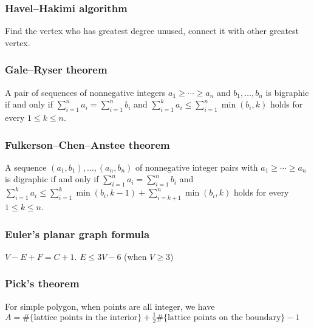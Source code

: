 \subsubsection{Havel–Hakimi algorithm}
Find the vertex who has greatest degree unused, connect it with other greatest vertex.

\subsubsection{Gale–Ryser theorem}
A pair of sequences of nonnegative integers $a_1\ge\cdots\ge a_n$ and $b_1,\ldots,b_n$ is bigraphic if and only if $\sum_{i=1}^n a_i=\sum_{i=1}^n b_i$ and $\sum_{i=1}^k a_i\le \sum_{i=1}^n\min(b_i,k)$ holds for every $1\le k\le n$.

\subsubsection{Fulkerson–Chen–Anstee theorem}
A sequence $(a_1,b_1),\ldots,(a_n,b_n)$ of nonnegative integer pairs with $a_1\ge\cdots\ge a_n$ is digraphic if and only if $\sum_{i=1}^n a_i=\sum_{i=1}^n b_i$ and $\sum_{i=1}^k a_i\le \sum_{i=1}^k\min(b_i,k-1)+\sum_{i=k+1}^n\min(b_i,k)$ holds for every $1\le k\le n$.


\subsubsection{Euler's planar graph formula}
$V-E+F=C+1$. $E\leq 3V-6$ (when $V\geq 3$)

\subsubsection{Pick's theorem}
For simple polygon, when points are all integer, we have $A=\text{\#\{lattice points in the interior\}} + \frac{1}{2} \text{\#\{lattice points on the boundary\}} - 1$


